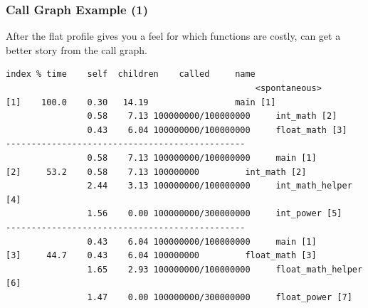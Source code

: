 \begin{frame}[fragile]
  \frametitle{Call Graph Example (1)}


\begin{changemargin}{1.5cm}
  
    After the flat profile gives you a feel for which functions are costly, 
      can get a better story from the call graph.
  \vfill
  \begin{lstlisting}[basicstyle=\tiny]
index % time    self  children    called     name
                                                 <spontaneous>
[1]    100.0    0.30   14.19                 main [1]
                0.58    7.13 100000000/100000000     int_math [2]
                0.43    6.04 100000000/100000000     float_math [3]
-----------------------------------------------
                0.58    7.13 100000000/100000000     main [1]
[2]     53.2    0.58    7.13 100000000         int_math [2]
                2.44    3.13 100000000/100000000     int_math_helper [4]
                1.56    0.00 100000000/300000000     int_power [5]
-----------------------------------------------
                0.43    6.04 100000000/100000000     main [1]
[3]     44.7    0.43    6.04 100000000         float_math [3]
                1.65    2.93 100000000/100000000     float_math_helper [6]
                1.47    0.00 100000000/300000000     float_power [7]
  \end{lstlisting}
  \end{changemargin}
\end{frame}

